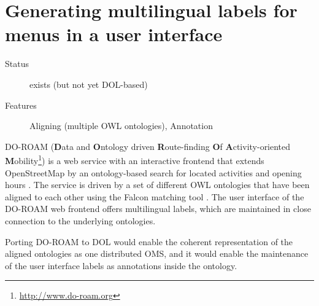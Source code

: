 \documentclass[10pt,%
\ifpretendfinal
final%
\else
draft%
\fi,
]{scrreprt}
\newcommand{\sclause}[1]{\section{#1}}
\begin{document}
\newenvironment{usecase}[3]{\sclause{#1}%
\begin{description}
\item[Status] #2
\item[Features] #3
\end{description}
}{}
\begin{usecase}{Generating multilingual labels for menus in a user interface}{exists (but not yet DOL-based)}{Aligning (multiple OWL ontologies), Annotation}
  DO-ROAM (\textbf{D}ata and \textbf{O}ntology driven \textbf{R}oute-finding \textbf{O}f \textbf{A}ctivity-oriented \textbf{M}obility\footnote{\url{http://www.do-roam.org}}) is a web service with an interactive frontend that extends OpenStreetMap by an ontology-based search for located activities and opening hours \cite{do-roam}.  The service is driven by a set of different OWL ontologies that have been aligned to each other using the Falcon matching tool \cite{HuQu-08}.  The user interface of the DO-ROAM web frontend offers multilingual labels, which are maintained in close connection to the underlying ontologies.

  Porting DO-ROAM to DOL would enable the coherent representation of the aligned ontologies as one distributed OMS, and it would enable  the maintenance of the user interface labels as annotations inside the ontology.
\end{usecase}
\end{document}
